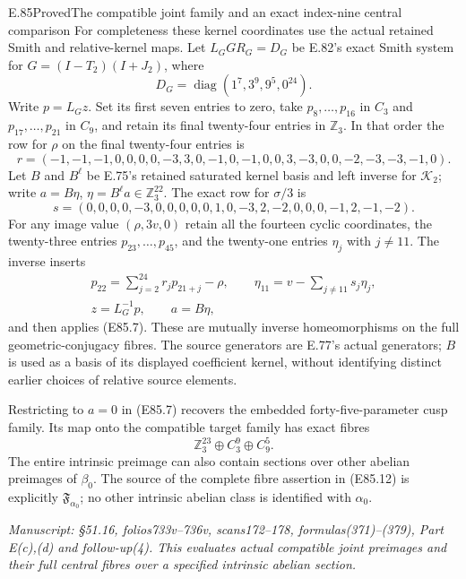 \begin{statement}{E.85}{Proved}{The compatible joint family and an exact index-nine central comparison}
For completeness these kernel coordinates use the
actual retained Smith and relative-kernel maps.
Let $L_GGR_G=D_G$ be E.82's exact Smith system for
$G=(I-T_2)(I+J_2)$, where
\[
 D_G=\operatorname{diag}(1^7,3^9,9^5,0^{24}).
 \tag{E85.14}
\]
Write $p=L_Gz$. Set its first seven entries to zero,
take $p_8,\ldots,p_{16}$ in $C_3$ and
$p_{17},\ldots,p_{21}$ in $C_9$, and retain its final
twenty-four entries in $\mathbb Z_3$. In that order
the row for $\rho$ on the final twenty-four entries is
\[
 r=(-1,-1,-1,0,0,0,0,-3,3,0,-1,0,-1,0,0,3,-3,0,0,-2,-3,-3,-1,0).
 \tag{E85.15}
\]
Let $B$ and $B^{\ell}$ be E.75's retained saturated
kernel basis and left inverse for $\mathcal K_2$;
write $a=B\eta$, $\eta=B^{\ell}a\in\mathbb Z_3^{22}$.
The exact row for $\sigma/3$ is
\[
 s=(0,0,0,0,-3,0,0,0,0,0,1,0,-3,2,-2,0,0,0,-1,2,-1,-2).
 \tag{E85.16}
\]
For any image value $(\rho,3v,0)$ retain all the
fourteen cyclic coordinates, the twenty-three
entries $p_{23},\ldots,p_{45}$, and the twenty-one
entries $\eta_j$ with $j\ne11$. The inverse inserts
\[
 \begin{gathered}
 p_{22}=\sum_{j=2}^{24}r_j p_{21+j}-\rho,\qquad
 \eta_{11}=v-\sum_{j\ne11}s_j\eta_j,\\
             z=L_G^{-1}p,\qquad a=B\eta,
 \end{gathered}
 \tag{E85.17}
\]
and then applies (E85.7). These are mutually inverse
homeomorphisms on the full geometric-conjugacy
fibres. The source generators are E.77's actual
generators; $B$ is used as a basis of its displayed
coefficient kernel, without identifying distinct
earlier choices of relative source elements.

Restricting to $a=0$ in (E85.7) recovers the
embedded forty-five-parameter cusp family. Its
map onto the compatible target family has exact
fibres
\[
                   \mathbb Z_3^{23}\oplus C_3^9\oplus C_9^5.
 \tag{E85.18}
\]
The entire intrinsic preimage can also contain
sections over other abelian preimages of $\beta_0$.
The source of the complete fibre assertion in
(E85.12) is explicitly $\mathfrak F_{\alpha_0}$;
no other intrinsic abelian class is identified
with $\alpha_0$.

\emph{Manuscript: \S51.16, folios733v--736v,
scans172--178, formulas(371)--(379), Part E(c),(d)
and follow-up(4). This evaluates actual compatible
joint preimages and their full central fibres over
a specified intrinsic abelian section.}
\end{statement}

